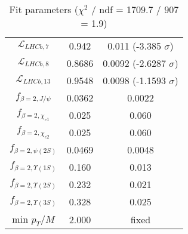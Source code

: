 \begin{table}[h!]
\begin{tabular}{c|c|c}
$\mathcal L_{LHCb,7}$ & 0.942 & 0.011 (-3.385 $\sigma$) \\
$\mathcal L_{LHCb,8}$ & 0.8686 & 0.0092 (-2.6287 $\sigma$) \\
$\mathcal L_{LHCb,13}$ & 0.9548 & 0.0098 (-1.1593 $\sigma$) \\
$f_{\beta=2,J/\psi}$ & 0.0362 & 0.0022 \\
$f_{\beta=2,\chi_{c1}}$ & 0.025 & 0.060 \\
$f_{\beta=2,\chi_{c2}}$ & 0.025 & 0.060 \\
$f_{\beta=2,\psi(2S)}$ & 0.0469 & 0.0048 \\
$f_{\beta=2,\Upsilon(1S)}$ & 0.160 & 0.013 \\
$f_{\beta=2,\Upsilon(2S)}$ & 0.232 & 0.021 \\
$f_{\beta=2,\Upsilon(3S)}$ & 0.328 & 0.025 \\
min $p_T/M$ & 2.000 & fixed \\
\end{tabular}
\caption{Fit parameters ($\chi^2$ / ndf = 1709.7 / 907 = 1.9)}
\end{table}
